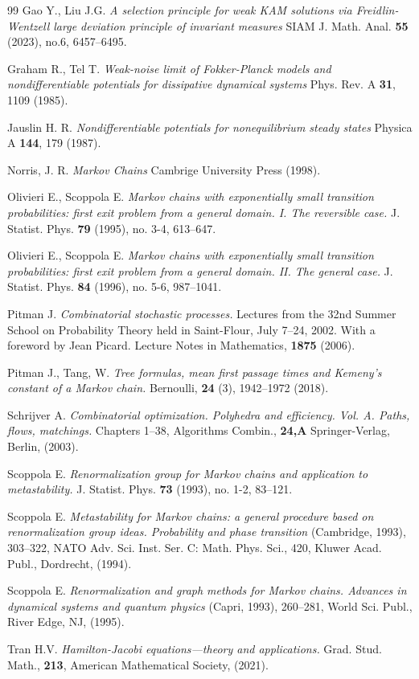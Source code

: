 \documentclass[reqno]{amsart}
\theoremstyle{plain}
\theoremstyle{definition}
\theoremstyle{remark}
\numberwithin{equation}{section}
\numberwithin{theorem}{section}
\newcommand{\<}{\langle}
\renewcommand{\>}{\rangle}
\begin{document}
\begin{thebibliography}{99}
 Gao Y., Liu J.G.
\emph{A selection principle for weak KAM solutions via Freidlin-Wentzell large deviation principle of invariant measures} SIAM J. Math. Anal. \textbf{55} (2023), no.6, 6457–6495. 

 Graham R., Tel T. {\it Weak-noise limit of Fokker-Planck models and nondifferentiable potentials for dissipative dynamical systems} Phys. Rev. A \textbf{31}, 1109 (1985). 

 Jauslin H. R. {\it Nondifferentiable potentials for
	nonequilibrium steady states} Physica A \textbf{144}, 179 (1987). 


 Norris, J. R. \emph{Markov Chains} Cambrige University Press (1998). 

 Olivieri E., Scoppola E. \emph{Markov chains with exponentially small transition probabilities: first exit problem from a general domain. I. The reversible case.} J. Statist. Phys. \textbf{79} (1995), no. 3-4, 613–647. 

 Olivieri E., Scoppola E. \emph{Markov chains with exponentially small transition probabilities: first exit problem from a general domain. II. The general case.} J. Statist. Phys. \textbf{84} (1996), no. 5-6, 987–1041. 

 Pitman J. \emph{Combinatorial stochastic processes.} Lectures from the 32nd Summer School on Probability Theory held in Saint-Flour, July 7–24, 2002. With a foreword by Jean Picard. Lecture Notes in Mathematics, \textbf{1875} (2006). 

 Pitman J., Tang, W. \emph{Tree formulas, mean first passage times and Kemeny’s constant of a Markov chain.} Bernoulli, \textbf{24} (3), 1942–1972 (2018). 

 Schrijver A. \emph{Combinatorial optimization. Polyhedra and efficiency. Vol. A. Paths, flows, matchings.} Chapters 1–38, Algorithms Combin., \textbf{24,A} Springer-Verlag, Berlin, (2003).   

  Scoppola E. \emph{Renormalization group for Markov chains and application to metastability.} J. Statist. Phys. \textbf{73} (1993), no. 1-2, 83–121. 

  Scoppola E. \emph{Metastability for Markov chains: a general procedure based on renormalization group ideas. Probability and phase transition} (Cambridge, 1993), 303–322, NATO Adv. Sci. Inst. Ser. C: Math. Phys. Sci., 420, Kluwer Acad. Publ., Dordrecht, (1994). 

 Scoppola E. \emph{Renormalization and graph methods for Markov chains. Advances in dynamical systems and quantum physics} (Capri, 1993), 260–281, World Sci. Publ., River Edge, NJ, (1995). 


 Tran H.V. \emph{Hamilton-Jacobi equations—theory and applications.}
Grad. Stud. Math., \textbf{213}, American Mathematical Society, (2021). 
\end{thebibliography}
\end{document}
